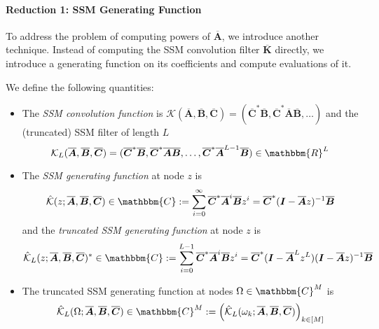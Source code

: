 \paragraph{Reduction 1: SSM Generating Function}

To address the problem of computing powers of \( \bm{\overline{A}} \), we introduce another technique.
Instead of computing the SSM convolution filter \( \bm{\overline{K}} \) directly,
we introduce a generating function on its coefficients and compute evaluations of it.

\begin{definition}%
  \label{def:generating-function}
  We define the following quantities:
  \begin{itemize}%
    \item The \emph{SSM convolution function} is \( \mathcal{K}(\bm{\overline{A}}, \bm{\overline{B}}, \bm{\overline{C}}) = (\bm{\overline{C}}^*\bm{\overline{B}}, \bm{\overline{C}}^*\bm{\overline{A}}\bm{\overline{B}}, \dots) \)
      and the (truncated) SSM filter of length \( L \)
      \begin{equation}
        \mathcal{K}_L(\bm{\overline{A}}, \bm{\overline{B}}, \bm{\overline{C}}) = (\bm{\overline{C}}^*\bm{\overline{B}}, \bm{\overline{C}}^*\bm{\overline{A}}\bm{\overline{B}}, \dots, \bm{\overline{C}}^*\bm{\overline{A}}^{L-1}\bm{\overline{B}}) \in \mathbbm{R}^L
      \end{equation}
    \item The \emph{SSM generating function} at node \( z \) is
      \begin{equation}
        \label{eq:generating-function}
        \hat{\mathcal{K}}(z; \bm{\overline{A}}, \bm{\overline{B}}, \bm{\overline{C}}) \in \mathbbm{C} := \sum_{i=0}^\infty \bm{\overline{C}}^* \bm{\overline{A}}^i \bm{\overline{B}} z^i
        = \bm{\overline{C}}^* (\bm{I} - \bm{\overline{A}} z)^{-1} \bm{\overline{B}}
      \end{equation}
      and the \emph{truncated SSM generating function} at node \( z \) is
      \begin{equation}
        \hat{\mathcal{K}}_L(z; \bm{\overline{A}}, \bm{\overline{B}}, \bm{\overline{C}})^* \in \mathbbm{C} := \sum_{i=0}^{L-1} \bm{\overline{C}}^* \bm{\overline{A}}^i \bm{\overline{B}} z^i
        = \bm{\overline{C}}^* (\bm{I} - \bm{\overline{A}}^L z^L) (\bm{I} - \bm{\overline{A}} z)^{-1} \bm{\overline{B}}
      \end{equation}
    \item The truncated SSM generating function at nodes \( \Omega \in \mathbbm{C}^M \) is
      \begin{equation}
        \hat{\mathcal{K}}_L(\Omega; \bm{\overline{A}}, \bm{\overline{B}}, \bm{\overline{C}}) \in \mathbbm{C}^M := \left( \hat{\mathcal{K}}_L(\omega_k; \bm{\overline{A}}, \bm{\overline{B}}, \bm{\overline{C}}) \right)_{k \in [M]}
      \end{equation}

  \end{itemize}
\end{definition}


